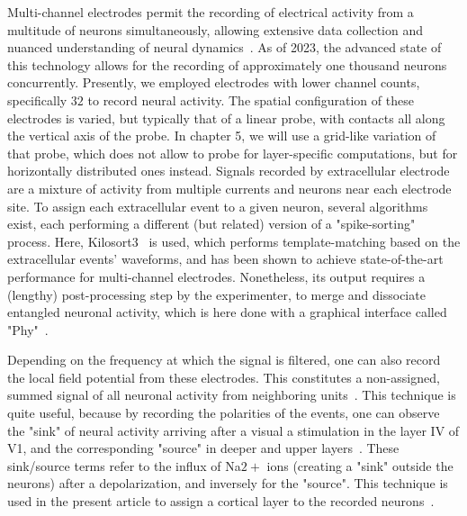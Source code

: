 Multi-channel electrodes permit the recording of electrical activity from a multitude of neurons simultaneously, allowing extensive data collection and nuanced understanding of neural dynamics~\cite{steinmetz2018challenges,steinmetz2021neuropixels}. As of 2023, the advanced state of this technology allows for the recording of approximately one thousand neurons concurrently. Presently, we employed electrodes with lower channel counts, specifically $32$ to record neural activity. The spatial configuration of these electrodes is varied, but typically that of a linear probe, with contacts all along the vertical axis of the probe. In chapter 5, we will use a grid-like variation of that probe, which does not allow to probe for layer-specific computations, but for horizontally distributed ones instead.
Signals recorded by extracellular electrode are a mixture of activity from multiple currents and neurons near each electrode site. To assign each extracellular event to a given neuron, several algorithms exist, each performing a different (but related) version of a "spike-sorting" process. Here, Kilosort3~\cite{pachitariu2016kilosort, rossant2016spike} is used, which performs template-matching based on the extracellular events' waveforms, and has been shown to achieve state-of-the-art performance for multi-channel electrodes. Nonetheless, its output requires a (lengthy) post-processing step by the experimenter, to merge and dissociate entangled neuronal activity, which is here done with a graphical interface called "Phy"~\cite{rossant2016spike}. 

Depending on the frequency at which the signal is filtered, one can also record the local field potential from these electrodes. This constitutes a non-assigned, summed signal of all neuronal activity from neighboring units~\cite{kajikawa2011local,herreras2016local}. This technique is quite useful, because by recording the polarities of the events, one can observe the "sink" of neural activity arriving after a visual a stimulation in the layer IV of \gls{V1}, and the corresponding "source" in deeper and upper layers~\cite{schaefer2015quantification}. These sink/source terms refer to the influx of Na$2+$ ions (creating a "sink" outside the neurons) after a depolarization, and inversely for the "source". This technique is used in the present article to assign a cortical layer to the recorded neurons~\cite{ladret2023cortical}.

